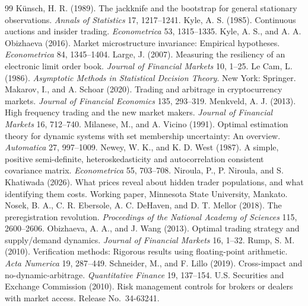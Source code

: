 \documentclass[12pt]{article}
\theoremstyle{definition}
\theoremstyle{remark}
\begin{document}
\begin{thebibliography}{99}
 K\"unsch, H. R. (1989). The jackknife and the bootstrap for general stationary observations. \emph{Annals of Statistics} 17, 1217--1241.
 Kyle, A. S. (1985). Continuous auctions and insider trading. \emph{Econometrica} 53, 1315--1335.
 Kyle, A. S., and A. A. Obizhaeva (2016). Market microstructure invariance: Empirical hypotheses. \emph{Econometrica} 84, 1345--1404.
 Large, J. (2007). Measuring the resiliency of an electronic limit order book. \emph{Journal of Financial Markets} 10, 1--25.
 Le Cam, L. (1986). \emph{Asymptotic Methods in Statistical Decision Theory}. New York: Springer.
 Makarov, I., and A. Schoar (2020). Trading and arbitrage in cryptocurrency markets. \emph{Journal of Financial Economics} 135, 293--319.
 Menkveld, A. J. (2013). High frequency trading and the new market makers. \emph{Journal of Financial Markets} 16, 712--740.
 Milanese, M., and A. Vicino (1991). Optimal estimation theory for dynamic systems with set membership uncertainty: An overview. \emph{Automatica} 27, 997--1009.
 Newey, W. K., and K. D. West (1987). A simple, positive semi-definite, heteroskedasticity and autocorrelation consistent covariance matrix. \emph{Econometrica} 55, 703--708.
 Niroula, P., P. Niroula, and S. Khatiwada (2026). What prices reveal about hidden trader populations, and what identifying them costs. Working paper, Minnesota State University, Mankato.
 Nosek, B. A., C. R. Ebersole, A. C. DeHaven, and D. T. Mellor (2018). The preregistration revolution. \emph{Proceedings of the National Academy of Sciences} 115, 2600--2606.
 Obizhaeva, A. A., and J. Wang (2013). Optimal trading strategy and supply/demand dynamics. \emph{Journal of Financial Markets} 16, 1--32.
 Rump, S. M. (2010). Verification methods: Rigorous results using floating-point arithmetic. \emph{Acta Numerica} 19, 287--449.
 Schneider, M., and F. Lillo (2019). Cross-impact and no-dynamic-arbitrage. \emph{Quantitative Finance} 19, 137--154.
 U.S. Securities and Exchange Commission (2010). Risk management controls for brokers or dealers with market access. Release No.\ 34-63241.

\end{thebibliography}
\end{document}
